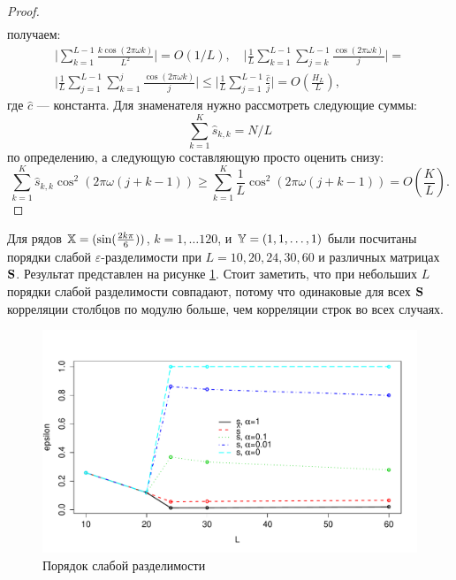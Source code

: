 \documentclass[12pt,a4paper,fleqn,leqno]{article}
\begin{document}
\begin{proof}
\begin{gather*}
\end{gather*}
получаем:
\begin{gather*}
\bigg|\sum_{k=1}^{L-1} \frac{k \cos(2 \pi \omega k)}{L^2}\bigg| = O(1/L), \quad
\bigg|\frac{1}{L}\sum_{k = 1}^{L-1}\sum_{j = k}^{L-1}\frac{\cos(2 \pi \omega k)}{j}\bigg| = \\ \bigg|\frac{1}{L}\sum_{j = 1}^{L-1}\sum_{k = 1}^{j}\frac{\cos(2 \pi \omega k)}{j}\bigg| \le \bigg|\frac{1}{L}\sum_{j = 1}^{L-1}\frac{\hat c}{j}\bigg| = O \left(\frac{H_L}{L} \right),
\end{gather*}
где $\hat c$ --- константа. Для знаменателя нужно рассмотреть следующие суммы:
\begin{equation*}
\sum_{k=1}^K \hat s_{k,k} = N / L
\end{equation*}
по определению, а следующую составляющую просто оценить снизу:
\begin{equation*}
\sum_{k=1}^K \hat s_{k,k}\cos^2(2 \pi \omega (j + k - 1)) \ge \sum_{k=1}^K \frac{1}{L}\cos^2(2 \pi \omega (j + k - 1)) = O \left(\frac{K}{L} \right).
\end{equation*}
\end{proof}
Для рядов $\mathbb{X}=(\sin(\frac{2 k \pi}{6}))$, $k = 1, \ldots 120$, и $\mathbb{Y} = (1, 1, \ldots, 1)$ были посчитаны порядки слабой $\varepsilon$-разделимости при $L = 10, 20, 24, 30, 60$ и различных матрицах $\mathbf{S}$. Результат представлен на рисунке \ref{weakcorrimg}. Стоит заметить, что при небольших $L$ порядки слабой разделимости совпадают, потому что одинаковые для всех $\mathbf{S}$ корреляции столбцов по модулю больше, чем корреляции строк во всех случаях.
\begin{figure}[!h] \begin{center}
\includegraphics[width = 15cm]{weakcorr.pdf}\caption{Порядок слабой разделимости}\label{weakcorrimg}
\end{center}\end{figure}
\end{document}
